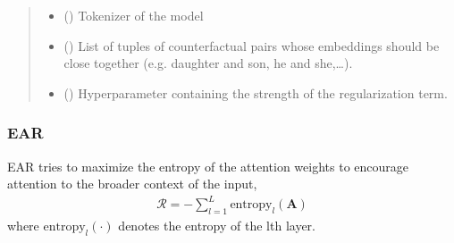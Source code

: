 \documentclass[letterpaper,10pt,english]{sphinxmanual}
\begin{document}
\begin{fulllineitems}
\begin{fulllineitems}
\begin{quote}
\begin{description}
\begin{itemize}
\item {} 
\sphinxAtStartPar
{} () \textendash{} Tokenizer of the model

\item {} 
\sphinxAtStartPar
{} (\sphinxstyleliteralemphasis{\sphinxupquote{{[}}}\sphinxstyleliteralemphasis{\sphinxupquote{{[}}}\sphinxstyleliteralemphasis{\sphinxupquote{{]}}}\sphinxstyleliteralemphasis{\sphinxupquote{{]}}}) \textendash{} List of tuples of counterfactual pairs whose embeddings should be close together
(e.g. daughter and son, he and she,…).

\item {} 
\sphinxAtStartPar
{} () \textendash{} Hyper\sphinxhyphen{}parameter containing the strength of the regularization term.

\end{itemize}

\end{description}\end{quote}

\end{fulllineitems}


\end{fulllineitems}



\subsubsection{EAR}
\label{\detokenize{algorithms_inprocessors:ear}}\label{\detokenize{algorithms_inprocessors:id4}}
\sphinxAtStartPar
EAR  tries to maximize the entropy of the attention weights to encourage attention to the broader context
of the input,
\begin{equation*}
\begin{split}\mathcal{R} = - \sum_{l=1}^L \text{entropy}_l(\mathbf{A})\end{split}
\end{equation*}
\sphinxAtStartPar
where \(\text{entropy}_l(\cdot)\) denotes the entropy of the l\sphinxhyphen{}th layer.
\end{document}
